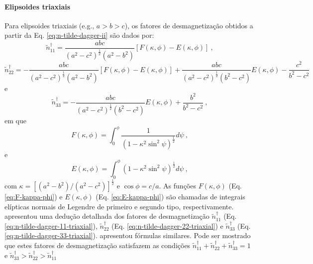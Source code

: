 \paragraph*{Elipsoides triaxiais}

Para elipsoides triaxiais (e.g., $a > b > c$), os fatores de desmagnetização obtidos a partir da Eq. \ref{eq:n-tilde-dagger-ii} são dados por:
\begin{equation}
\tilde{n}^{\dagger}_{11} = \frac{abc}
{\left( a^{2} - c^{2} \right)^{\frac{1}{2}} 
	\left( a^{2} - b^{2} \right)} 
\left[ F(\kappa, \phi) - E(\kappa, \phi) \right] \: ,
\label{eq:n-tilde-dagger-11-triaxial}
\end{equation}
\begin{equation}
\tilde{n}^{\dagger}_{22} = 
-\frac{abc}
{\left( a^{2} - c^{2} \right)^{\frac{1}{2}} 
	\left( a^{2} - b^{2} \right)} 
\left[ F(\kappa, \phi) - E(\kappa, \phi) \right] + 
\frac{abc}
{\left( a^{2} - c^{2} \right)^{\frac{1}{2}} 
	\left( b^{2} - c^{2} \right)} E(\kappa, \phi)
- \frac{c^{2}}{b^{2} - c^{2}}
\label{eq:n-tilde-dagger-22-triaxial}
\end{equation}
e
\begin{equation}
\tilde{n}^{\dagger}_{33} = 
-\frac{abc}
{\left( a^{2} - c^{2} \right)^{\frac{1}{2}} 
	\left( b^{2} - c^{2} \right)} E(\kappa, \phi) +
\frac{b^{2}}{b^{2} - c^{2}} \: ,
\label{eq:n-tilde-dagger-33-triaxial}
\end{equation}
em que
\begin{equation}
F(\kappa, \phi) = 
\int^{\phi}_{0} 
\frac{1}{\left( 1 - \kappa^{2} \sin^{2} \psi \right)^{\frac{1}{2}}}
d\psi \: ,
\label{eq:F-kappa-phi}
\end{equation}
e
\begin{equation}
E(\kappa, \phi) = 
\int^{\phi}_{0} 
\left( 1 - \kappa^{2} \sin^{2} \psi \right)^{\frac{1}{2}}
d\psi \: ,
\label{eq:E-kappa-phi}
\end{equation}
com $\kappa = \left[ \left( a^{2} - b^{2} \right) / 
\left( a^{2} - c^{2} \right) \right]^{\frac{1}{2}}$ e
$\cos \phi = c/a$.
As funções $F(\kappa, \phi)$ (Eq. \ref{eq:F-kappa-phi}) e 
$E(\kappa, \phi)$ (Eq. \ref{eq:E-kappa-phi}) são chamadas de integrais elípticas normais de Legendre de primeiro e segundo tipo, respectivamente. \citet{stoner1945} apresentou uma dedução detalhada dos fatores de desmagnetização $\tilde{n}^{\dagger}_{11}$ (Eq. \ref{eq:n-tilde-dagger-11-triaxial}), $\tilde{n}^{\dagger}_{22}$ (Eq. \ref{eq:n-tilde-dagger-22-triaxial}) e $\tilde{n}^{\dagger}_{33}$ (Eq. \ref{eq:n-tilde-dagger-33-triaxial}). \citet{clark1986} apresentou fórmulas similares.
Pode ser mostrado que estes fatores de desmagnetização satisfazem as condições $\tilde{n}^{\dagger}_{11} + \tilde{n}^{\dagger}_{22} + \tilde{n}^{\dagger}_{33} = 1$ e $\tilde{n}^{\dagger}_{33} > \tilde{n}^{\dagger}_{22} > \tilde{n}^{\dagger}_{11}$

